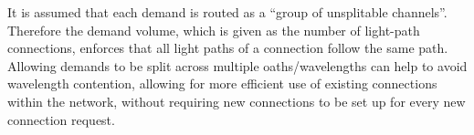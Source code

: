 It is assumed that each demand is routed as a ``group of unsplitable channels''.
Therefore the demand volume, which is given as the number of light-path
connections, enforces that all light paths of a connection follow the same path.
Allowing demands to be split across multiple oaths/wavelengths can help to avoid
wavelength contention, allowing for more efficient use of existing connections
within the network, without requiring new connections to be set up for every new
connection request.
